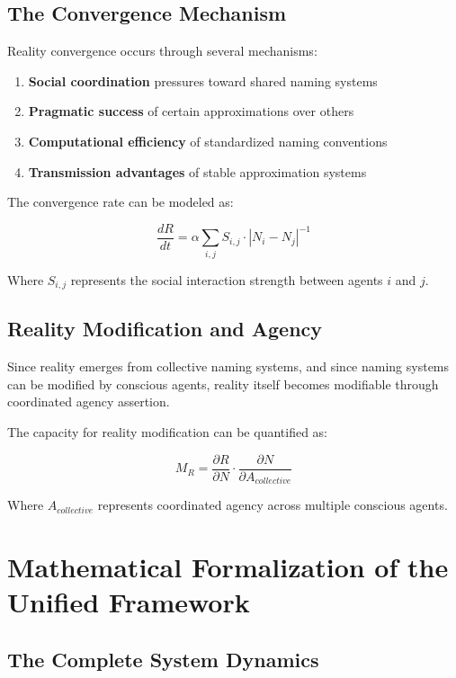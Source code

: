 \documentclass[12pt]{article}
\begin{document}
\subsection{The Convergence Mechanism}

Reality convergence occurs through several mechanisms:

\begin{enumerate}
\item \textbf{Social coordination} pressures toward shared naming systems
\item \textbf{Pragmatic success} of certain approximations over others
\item \textbf{Computational efficiency} of standardized naming conventions
\item \textbf{Transmission advantages} of stable approximation systems
\end{enumerate}

The convergence rate can be modeled as:

$$\frac{dR}{dt} = \alpha \sum_{i,j} S_{i,j} \cdot |N_i - N_j|^{-1}$$

Where $S_{i,j}$ represents the social interaction strength between agents $i$ and $j$.

\subsection{Reality Modification and Agency}

Since reality emerges from collective naming systems, and since naming systems can be modified by conscious agents, reality itself becomes modifiable through coordinated agency assertion.

The capacity for reality modification can be quantified as:

$$M_R = \frac{\partial R}{\partial N} \cdot \frac{\partial N}{\partial A_{collective}}$$

Where $A_{collective}$ represents coordinated agency across multiple conscious agents.

\section{Mathematical Formalization of the Unified Framework}

\subsection{The Complete System Dynamics}
\end{document}
